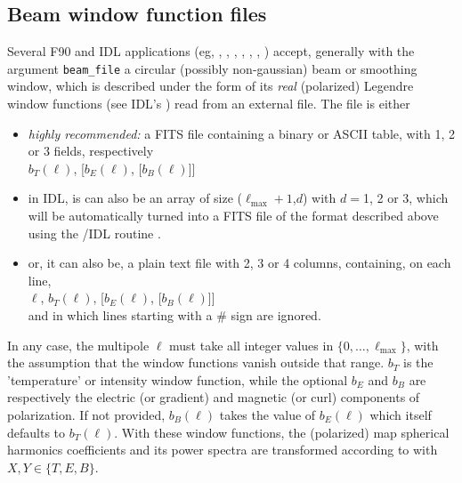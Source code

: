 \documentclass[12pt,twoside]{article}
\newcommand{\lmax}{\ell_{\mathrm{max}}}
\begin{document}
\subsection{Beam window function files}
\label{fac:subsec:beamfiles}
Several F90 and IDL applications (eg,
, 
, 
, 
, 
, 
, 
)
accept, generally with the argument {\tt beam\_file} a circular (possibly non-gaussian) beam or smoothing window,
which is described under the form of its {\em real} (polarized) Legendre window functions
(see IDL's )
read from an external file.\label{page:beamfiles}
The file is either 
\begin{itemize}
\item 
{\em highly recommended:} a FITS file containing a binary or ASCII table, with 1, 2 or 3 fields, respectively\\
$b_T(\ell)$, [$b_E(\ell)$, [$b_B(\ell)$]]
\item 
 in IDL, is can also be an array of size ($\lmax+1$,$d$) with $d=$1, 2 or 3, which will be 
automatically turned into a FITS file of the format described above using the 
\healpixns/IDL routine .
\item 
or, it can also be, a plain text file with 2, 3 or 4 columns, containing, on each line,  \\
$\ell$, $b_T(\ell)$, [$b_E(\ell)$, [$b_B(\ell)$]]\\ 
and in which lines starting with a \# sign are ignored.
\end{itemize}
In any case, 
the multipole $\ell$ must take all integer values in $\{0,\ldots,\lmax\}$, 
with the assumption that the window functions vanish outside that range.
$b_T$ is the 'temperature' or intensity window function, 
while the optional $b_E$ and $b_B$ are respectively the electric (or gradient) and
magnetic (or curl) components of polarization.
If not provided, $b_B(\ell)$ takes the value of $b_E(\ell)$ which itself defaults to $b_T(\ell)$.
With these window functions, the (polarized) 
map spherical harmonics coefficients and its power spectra are transformed according to
with $X,Y \in \{T,E,B\}$.
\end{document}
